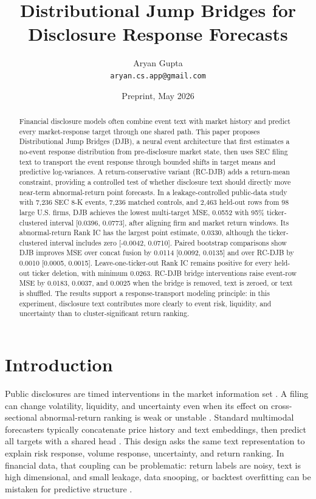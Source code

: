 \documentclass[10pt,letterpaper]{article}
\title{Distributional Jump Bridges for Disclosure Response Forecasts}
\author{
Aryan Gupta\\
\texttt{aryan.cs.app@gmail.com}
}
\date{Preprint, May 2026}
\begin{document}
\maketitle

\begin{abstract}
Financial disclosure models often combine event text with market history and predict every
market-response target through one shared path. This paper proposes Distributional Jump Bridges
(DJB), a neural event architecture that first estimates a no-event response distribution from
pre-disclosure market state, then uses SEC filing text to transport the event response through
bounded shifts in target means and predictive log-variances. A return-conservative variant
(RC-DJB) adds a return-mean constraint, providing a controlled test of whether disclosure text
should directly move near-term abnormal-return point forecasts. In a leakage-controlled
public-data study with 7,236 SEC 8-K events, 7,236 matched controls, and 2,463 held-out rows from
98 large U.S. firms, DJB achieves the lowest multi-target MSE, 0.0552 with 95\%
ticker-clustered interval [0.0396, 0.0773],
after aligning firm and market return windows. Its abnormal-return Rank IC has the largest point
estimate, 0.0330, although the ticker-clustered interval includes zero
[-0.0042, 0.0710]. Paired bootstrap comparisons show DJB improves MSE over concat fusion by 0.0114
[0.0092, 0.0135] and over RC-DJB by 0.0010 [0.0005, 0.0015]. Leave-one-ticker-out Rank IC remains
positive for every held-out ticker deletion, with minimum 0.0263. RC-DJB bridge interventions raise
event-row MSE by 0.0183, 0.0037, and 0.0025 when the bridge is removed, text is zeroed, or text is
shuffled. The results support a response-transport modeling principle: in this experiment,
disclosure text contributes more clearly to event risk, liquidity, and uncertainty than to
cluster-significant return ranking.
\end{abstract}

\section{Introduction}

Public disclosures are timed interventions in the market information set
\citep{fama1970efficient,beaver1968information,patell1984anticipated}. A filing can change
volatility, liquidity, and uncertainty even when its effect on cross-sectional abnormal-return
ranking is weak or unstable \citep{bamber1986volume,kothari2001capital}. Standard multimodal
forecasters typically concatenate price history and text embeddings, then predict all targets with a
shared head \citep{vaswani2017attention,lim2021temporal,chen2025camef}. This design asks the same
text representation to explain risk response, volume response, uncertainty, and return ranking. In
financial data, that coupling can be problematic: return labels are noisy, text is high dimensional,
and small leakage, data snooping, or backtest overfitting can be mistaken for predictive structure
\citep{campbell1997econometrics,gu2020empirical,white2000reality,bailey2014probability,
lopezdeprado2018advances}.
\end{document}
